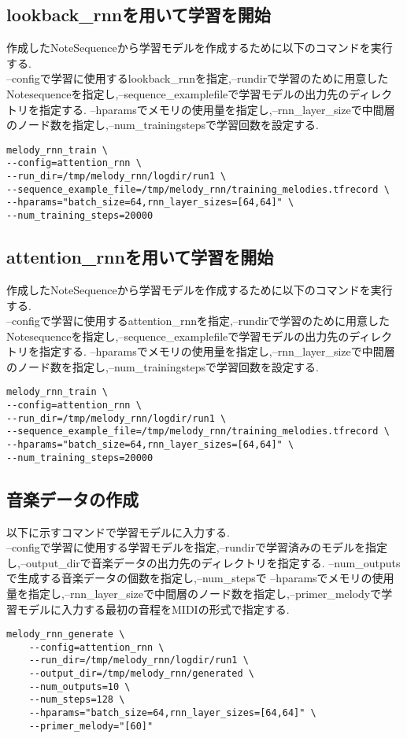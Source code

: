 \subsection{lookback\_rnnを用いて学習を開始}
作成したNoteSequenceから学習モデルを作成するために以下のコマンドを実行する.\\
--configで学習に使用するlookback\_rnnを指定,--rundirで学習のために用意したNotesequenceを指定し,--sequence\_examplefileで学習モデルの出力先のディレクトリを指定する.
--hparamsでメモリの使用量を指定し,--rnn\_layer\_sizeで中間層のノード数を指定し,--num\_trainingstepsで学習回数を設定する.\\
\begin{lstlisting}[basicstyle=\ttfamily\footnotesize,frame=single]
melody_rnn_train \
--config=attention_rnn \
--run_dir=/tmp/melody_rnn/logdir/run1 \
--sequence_example_file=/tmp/melody_rnn/training_melodies.tfrecord \
--hparams="batch_size=64,rnn_layer_sizes=[64,64]" \
--num_training_steps=20000
\end{lstlisting}
\subsection{attention\_rnnを用いて学習を開始}
作成したNoteSequenceから学習モデルを作成するために以下のコマンドを実行する.\\
--configで学習に使用するattention\_rnnを指定,--rundirで学習のために用意したNotesequenceを指定し,--sequence\_examplefileで学習モデルの出力先のディレクトリを指定する.
--hparamsでメモリの使用量を指定し,--rnn\_layer\_sizeで中間層のノード数を指定し,--num\_trainingstepsで学習回数を設定する.\\
\begin{lstlisting}[basicstyle=\ttfamily\footnotesize,frame=single]
melody_rnn_train \
--config=attention_rnn \
--run_dir=/tmp/melody_rnn/logdir/run1 \
--sequence_example_file=/tmp/melody_rnn/training_melodies.tfrecord \
--hparams="batch_size=64,rnn_layer_sizes=[64,64]" \
--num_training_steps=20000
\end{lstlisting}
\subsection{音楽データの作成}
以下に示すコマンドで学習モデルに入力する.\\
--configで学習に使用する学習モデルを指定,--rundirで学習済みのモデルを指定し,--output\_dirで音楽データの出力先のディレクトリを指定する.
--num\_outputsで生成する音楽データの個数を指定し,--num\_stepsで
--hparamsでメモリの使用量を指定し,--rnn\_layer\_sizeで中間層のノード数を指定し,--primer\_melodyで学習モデルに入力する最初の音程をMIDIの形式で指定する.\\
\begin{lstlisting}[basicstyle=\ttfamily\footnotesize,frame=single]
    melody_rnn_generate \
    --config=attention_rnn \
    --run_dir=/tmp/melody_rnn/logdir/run1 \
    --output_dir=/tmp/melody_rnn/generated \
    --num_outputs=10 \
    --num_steps=128 \
    --hparams="batch_size=64,rnn_layer_sizes=[64,64]" \
    --primer_melody="[60]"
\end{lstlisting}
